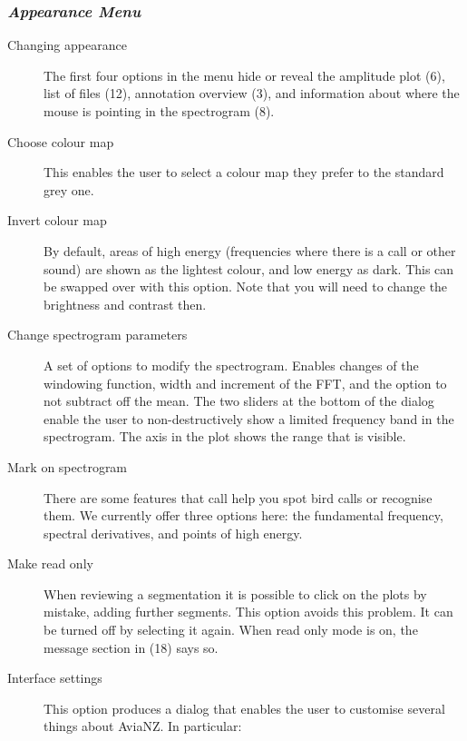 \documentclass{article}
\begin{document}
\subsubsection{{\em Appearance Menu}}

\begin{description}
\item [Changing appearance] The first four options in the menu hide or reveal the amplitude plot (6), list of files (12), annotation overview (3), and information about where the mouse is pointing in the spectrogram (8). 
\item [Choose colour map] This enables the user to select a colour map they prefer to the standard grey one. 
\item [Invert colour map] By default, areas of high energy (frequencies where there is a call or other sound) are shown as the lightest colour, and low energy as dark. This can be swapped over with this option. Note that you will need to change the brightness and contrast then. 
\item [Change spectrogram parameters] A set of options to modify the spectrogram. Enables changes of the windowing function, width and increment of the FFT, and the option to not subtract off the mean. %
The two sliders at the bottom of the dialog enable the user to non-destructively show a limited frequency band in the spectrogram. The axis in the plot shows the range that is visible. 
\item [Mark on spectrogram] There are some features that call help you spot bird calls or recognise them. We currently offer three options here: the fundamental frequency, spectral derivatives, and points of high energy. %
\item [Make read only] When reviewing a segmentation it is possible to click on the plots by mistake, adding further segments. This option avoids this problem. It can be turned off by selecting it again. When read only mode is on, the message section in (18) says so. 
\item [Interface settings] This option produces a dialog that enables the user to customise several things about AviaNZ. In particular:
\begin{description}

\end{description}
\end{description}
\end{document}
